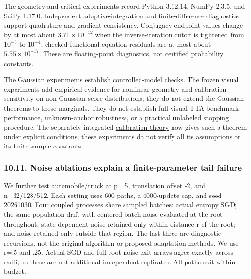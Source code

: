 The geometry and critical experiments record Python 3.12.14, NumPy
2.3.5, and SciPy 1.17.0. Independent adaptive-integration and
finite-difference diagnostics support quadrature and gradient
consistency. Conjugacy endpoint values change by at most about
\(3.71\times10^{-12}\) when the inverse-iteration cutoff is tightened
from \(10^{-3}\) to \(10^{-4}\); checked functional-equation residuals
are at most about \(5.55\times10^{-17}\). These are floating-point
diagnostics, not certified probability constants.

The Gaussian experiments establish controlled-model checks. The frozen
visual experiments add empirical evidence for nonlinear geometry and
calibration sensitivity on non-Gaussian score distributions; they do not
extend the Gaussian theorems to these marginals. They do not establish
full visual TTA benchmark performance, unknown-anchor robustness, or a
practical unlabeled stopping procedure. The separately integrated
\href{calibration.md}{calibration theory} now gives such a theorem under
explicit conditions; these experiments do not verify all its assumptions
or its finite-sample constants.

\subsubsection{10.11. Noise ablations explain a finite-parameter tail
failure}\label{experiments-noise-ablations-explain-a-finite-parameter-tail-failure}

We further test automobile/truck at p=.5, translation offset -2, and
n=32/128/512. Each setting uses 600 paths, a 4000-update cap, and seed
20261030. Four coupled processes share sampled batches: actual entropy
SGD; the same population drift with centered batch noise evaluated at
the root throughout; state-dependent noise retained only within distance
r of the root; and noise retained only outside that region. The last
three are diagnostic recursions, not the original algorithm or proposed
adaptation methods. We use r=.5 and .25. Actual-SGD and full root-noise
exit arrays agree exactly across radii, so these are not additional
independent replicates. All paths exit within budget.

